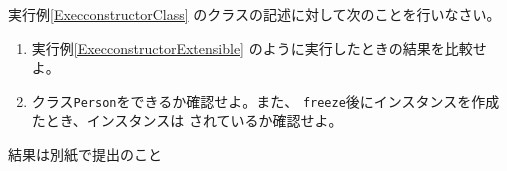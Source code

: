  \begin{Prob}\upshape
  実行例\else\ref{ExecconstructorClass}\fi
  のクラスの記述に対して次のことを行いなさい。
  \begin{enumerate}
   \item 実行例\else\ref{ExecconstructorExtensible}\fi
         のように実行したときの結果を比較せよ。
   \item クラス\texttt{Person}をできるか確認せよ。また、
         \texttt{freeze}後にインスタンスを作成たとき、インスタンスは
         されているか確認せよ。
  \end{enumerate}
 \end{Prob}
\ifText 結果は別紙で提出のこと\fi